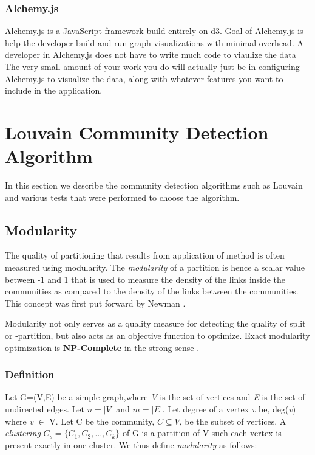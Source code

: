\subsection{Alchemy.js}
Alchemy.js is a JavaScript framework build entirely on d3. Goal of Alchemy.js is help the developer build and run graph visualizations with minimal overhead. A developer in Alchemy.js does not have to write much code to viaulize the data The very small amount of your work you do will actually just be in configuring Alchemy.js to visualize the data, along with whatever features you want to include in the application.

\chapter{Louvain Community Detection Algorithm}
In this section we describe the community detection algorithms such as Louvain and various tests that were performed to choose the algorithm. 
 
\section{Modularity}
The quality of partitioning that results from application of method is often measured using modularity. The \textit{modularity} of a partition is hence a scalar value between -1 and 1 that is used to measure the density of the links inside the communities as compared to the density of the links between the communities. This concept was first put forward by Newman \cite{newman2006modularity}.
\par
Modularity not only serves as a quality measure for detecting the quality of split or -partition, but also acts as an objective function to optimize.  Exact modularity optimization is \textbf{NP-Complete} in the strong sense \cite{modularityNP}.
\subsection{Definition}
Let G=(V,E) be a simple graph,where \textit{V} is the set of vertices and \textit{E} is the set of undirected edges. Let $n=|V|$ and $m=|E|$. Let degree of a vertex \textit{v} be, deg(\textit{v}) where \textit{v} $\in$ V. Let C be the community, $C \subseteq V$, be the subset of vertices. A \textit{clustering} $C_s =\{C_1,C_2, \ldots, C_k\}$ of G is a partition of V such each vertex is present exactly in one cluster.  We thus define \textit{modularity } as follows: \cite{modularityNP}

